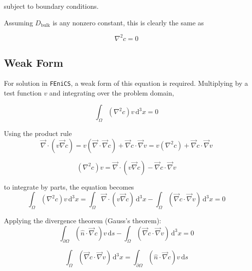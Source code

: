 subject to boundary conditions.

Assuming $D_{\mathrm{bulk}}$ is any nonzero constant, this is clearly the same as

\begin{equation}
\nabla^2 c = 0
\end{equation}


\subsection{Weak Form}\label{subsec:unhom_fick_weak}

For solution in \texttt{FEniCS}, a weak form of this equation is required.
Multiplying by a test function $v$ and integrating over the problem domain,

\begin{equation}
\int_{\Omega} \left(\nabla^2 c \right) v \,\mathrm{d}^3x = 0
\end{equation}

Using the product rule
\begin{equation}
\vec{\nabla} \cdot \left( v \vec{\nabla} c \right) =
v \left(\vec{\nabla} \cdot \vec{\nabla} c \right) + \vec{\nabla}c \cdot \vec{\nabla}v =
v \left(\nabla^2 c \right) + \vec{\nabla}c \cdot \vec{\nabla}v
\end{equation}

\begin{equation}\label{eq:product_rule_divergence}
\left(\nabla^2 c \right) v =
\vec{\nabla} \cdot \left( v \vec{\nabla} c \right) - \vec{\nabla}c \cdot \vec{\nabla}v
\end{equation}

to integrate by parts, the equation becomes
\begin{equation}
\int_{\Omega} \left(\nabla^2 c \right) v \,\mathrm{d}^3x =
\int_{\Omega} \vec{\nabla} \cdot \left( v \vec{\nabla} c \right) \,\mathrm{d}^3x
- \int_{\Omega} \left( \vec{\nabla}c \cdot \vec{\nabla}v \right) \,\mathrm{d}^3x =0
\end{equation}

Applying the divergence theorem (Gauss's theorem):
\begin{equation}
\int_{\partial\Omega} \left( \hat{n} \cdot \vec{\nabla} c \right) v\,\mathrm{d}s
- \int_{\Omega} \left( \vec{\nabla}c \cdot \vec{\nabla}v \right) \,\mathrm{d}^3x = 0
\end{equation}

\begin{equation}
\int_{\Omega} \left( \vec{\nabla}c \cdot \vec{\nabla}v \right) \,\mathrm{d}^3x =
\int_{\partial\Omega} \left( \hat{n} \cdot \vec{\nabla} c \right) v\,\mathrm{d}s
\end{equation}

